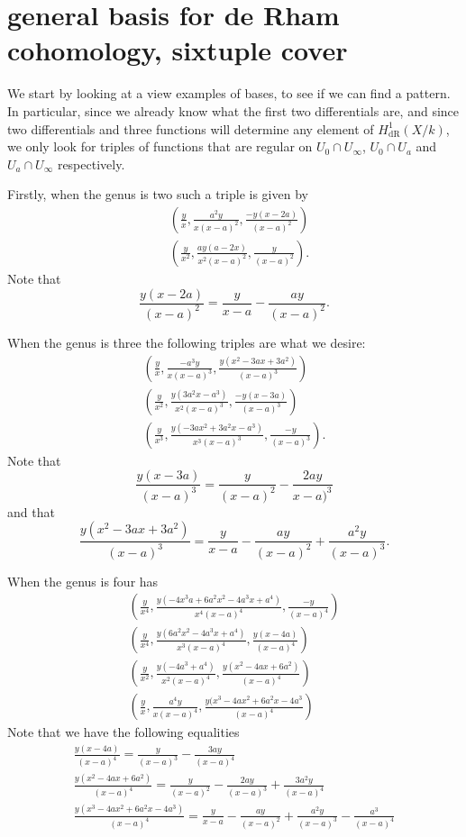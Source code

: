 \documentclass[draft, 11pt]{article} %
\theoremstyle{plain}
\theoremstyle{remark}
\newcommand{\derhamhone}{H_{\text {dR}}^1(X/k)}
\begin{document}
\section{general basis for de Rham cohomology, sixtuple cover}
We start by looking at a view examples of bases, to see if we can find a pattern.
In particular, since we already know what the first two differentials are, and since two differentials and three functions will determine any element of $\derhamhone$, we only look for triples of functions that are regular on $U_0\cap U_\infty$, $U_0\cap U_a$ and $U_a \cap U_\infty$ respectively.

Firstly, when the genus is two such a triple is given by
\begin{align}
& \left( \frac{y}{x}, \frac{a^2y}{x(x-a)^2}, \frac{-y(x-2a)}{(x-a)^2} \right) \\
& \left( \frac{y}{x^2}, \frac{ay(a-2x)}{x^2(x-a)^2},\frac{y}{(x-a)^2} \right).
\end{align}
Note that 
\[
\frac{y(x-2a)}{(x-a)^2} = \frac{y}{x-a} - \frac{ay}{(x-a)^2}.
\]

When the genus is three the following triples are what we desire:
\begin{align}
\left( \frac{y}{x}, \frac{-a^3y}{x(x-a)^3}, \frac{y(x^2 -3ax + 3a^2)}{(x-a)^3} \right) \\
\left( \frac{y}{x^2}, \frac{y(3a^2x - a^3)}{x^2(x-a)^3}, \frac{-y(x-3a)}{(x-a)^3} \right) \\
\left( \frac{y}{x^3}, \frac{y(-3ax^2+3a^2x-a^3)}{x^3 (x-a)^3}, \frac{-y}{(x-a)^3} \right).
\end{align}
Note that
\[
\frac{y(x-3a)}{(x-a)^3} = \frac{y}{(x-a)^2} - \frac{2ay}{x-a)^3}
\]
and that
\[
\frac{y(x^2-3ax+3a^2)}{(x-a)^3} = \frac{y}{x-a} - \frac{ay}{(x-a)^2} + \frac{a^2y}{(x-a)^3}.
\]

When the genus is four has
\begin{align}
\left( \frac{y}{x^4}, \frac{y(-4x^3a + 6a^2x^2 - 4a^3x + a^4)}{x^4(x-a)^4}, \frac{-y}{(x-a)^4} \right) \\
\left( \frac{y}{x^4}, \frac{y(6a^2x^2 - 4a^3x + a^4)}{x^3(x-a)^4},  \frac{y(x-4a)}{(x-a)^4} \right) \\
\left( \frac{y}{x^2},\frac{y(-4a^3+a^4)}{x^2(x-a)^4}, \frac{y(x^2-4ax+6a^2)}{(x-a)^4}\right) \\
\left ( \frac{y}{x}, \frac{a^4y}{x(x-a)^4}, \frac{y(x^3-4ax^2+6a^2x-4a^3}{(x-a)^4} \right)
\end{align}
Note that we have the following equalities
\begin{align}
\frac{y(x-4a)}{(x-a)^4} = \frac{y}{(x-a)^3} - \frac{3ay}{(x-a)^4} \\
\frac{y(x^2-4ax+6a^2)}{(x-a)^4} = \frac{y}{(x-a)^2} - \frac{2ay}{(x-a)^3} + \frac{3a^2y}{(x-a)^4}\\
\frac{y(x^3-4ax^2+6a^2x-4a^3)}{(x-a)^4} = \frac{y}{x-a} - \frac{ay}{(x-a)^2} + \frac{a^2y}{(x-a)^3} - \frac{a^3}{(x-a)^4}
\end{align}
\end{document}
